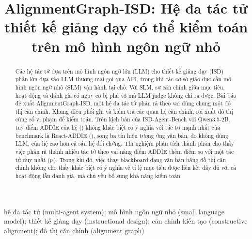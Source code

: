 \documentclass[conference,a4paper]{IEEEtran}
\begin{document}
\title{AlignmentGraph-ISD: Hệ đa tác tử\\
thiết kế giảng dạy có thể kiểm toán\\
trên mô hình ngôn ngữ nhỏ}

\author{
}

\maketitle

\begin{abstract}
Các hệ tác tử dựa trên mô hình ngôn ngữ lớn (LLM) cho thiết kế giảng dạy (ISD)
phần lớn dựa vào LLM thương mại gọi qua API, trong khi các cơ sở giáo dục cần mô hình ngôn
ngữ nhỏ (SLM) vận hành tại chỗ. Với SLM, sự căn chỉnh giữa mục tiêu, hoạt động và
đánh giá có nguy cơ bị phá vỡ mà LLM judge không chỉ ra được. Bài báo đề xuất
AlignmentGraph-ISD, một hệ đa tác tử phân rã theo vai dùng chung một đồ thị căn
chỉnh. Khung điều phối ghi và kiểm tra các quan hệ căn chỉnh, rồi xuất đồ thị cùng
sổ vi phạm để kiểm toán. Trên \NScenCmp{} kịch bản của ISD-Agent-Bench với Qwen3.5-2B, tuy điểm ADDIE
của hệ (\cmpAGAddie) không khác biệt có ý nghĩa với tác tử mạnh nhất của benchmark
là React-ADDIE (\cmpReactAddie), song ba tín hiệu tương ứng văn bản, đo không dùng
LLM, của hệ cao hơn cả sáu hệ đối chứng. Thí nghiệm phân tích thành phần cho thấy việc phân rã thành nhiều tác tử theo vai
nâng điểm ADDIE thêm \ablHDDiff{} điểm so với một tác tử duy nhất ($p$\,\ablHDP).
Trong khi đó, việc thay blackboard dạng văn bản bằng đồ thị căn chỉnh không cho thấy khác biệt có ý nghĩa về tỉ lệ mục tiêu được liên kết đầy đủ với cả hoạt động
lẫn đánh giá, mà chủ yếu bổ sung khả năng kiểm toán.
\end{abstract}

\begin{IEEEkeywords}
hệ đa tác tử (multi-agent system); mô hình ngôn ngữ nhỏ (small language model);
thiết kế giảng dạy (instructional design); căn chỉnh kiến tạo (constructive
alignment); đồ thị căn chỉnh (alignment graph)
\end{IEEEkeywords}
\end{document}

